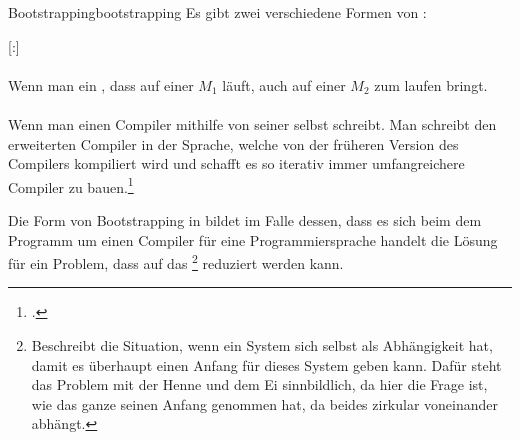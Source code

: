 \begin{Definition}{Bootstrapping}{bootstrapping}
  Es gibt zwei verschiedene Formen von :

  \setcounter{subdefcounter}{1}

  \titleformat{\paragraph}[runin]{\normalfont\normalsize\bfseries}{}{0mm}{}[:]

  \paragraph{\thesubdefcounter}\label{par:bootstrapping1}\hspace{-0.25cm}
  Wenn man ein , dass auf einer  $M_1$ läuft, auch auf einer  $M_2$ zum laufen bringt.


  \paragraph{\thesubdefcounter}\label{par:bootstrapping2}\hspace{-0.25cm}
  Wenn man einen Compiler mithilfe von  seiner selbst schreibt. Man schreibt den erweiterten Compiler in der Sprache, welche von der früheren Version des Compilers kompiliert wird und schafft es so iterativ immer umfangreichere Compiler zu bauen.\footcite{earley_formalism_1970}

\end{Definition}

Die Form von Bootstrapping in  bildet im Falle dessen, dass es sich beim dem Programm um einen Compiler für eine Programmiersprache handelt die Lösung für ein Problem, dass auf das \footnote{Beschreibt die Situation, wenn ein System sich selbst als Abhängigkeit hat, damit es überhaupt einen Anfang für dieses System geben kann. Dafür steht das Problem mit der Henne und dem Ei sinnbildlich, da hier die Frage ist, wie das ganze seinen Anfang genommen hat, da beides zirkular voneinander abhängt.} reduziert werden kann.

